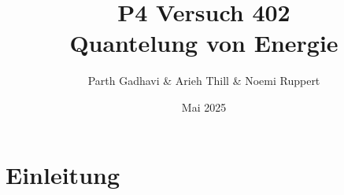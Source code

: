 \documentclass[ngerman]{scrartcl}
\title{P4 Versuch 402 \\[1ex] \large Quantelung von Energie}
\author{Parth Gadhavi \& Arieh Thill \& Noemi Ruppert}
\date{Mai 2025}
\begin{document}
\maketitle
\clearpage
\tableofcontents
\clearpage
\section{Einleitung}

\clearpage
\end{document}
